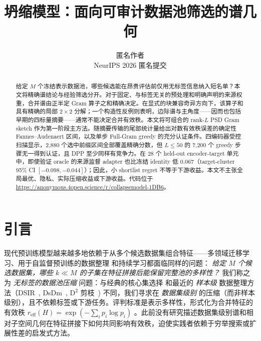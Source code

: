 \documentclass{article}
\title{坍缩模型：面向可审计数据池筛选的谱几何}
\author{%
  匿名作者\\
  NeurIPS 2026 匿名提交%
}
\date{}
\newcommand{\reff}{\ensuremath{r_{\mathrm{eff}}}\xspace}
\begin{document}
\maketitle

\begin{abstract}
给定 $M$ 个冻结表示数据池，哪些候选能在昂贵评估前仅用无标签信息纳入短名单？本文将精确谱结论与经验筛选分开。对于固定、与标签无关的预处理和明确声明的来源权重，合并谱由正半定 Gram 算子之和精确决定。在显式的块兼容奇异方向下，该算子和具有精确的局部 $2{\times}2$ 分解；一个构造性反例则表明，边际谱与主角度——因而也包括早期的四标量摘要——通常不能决定合并有效秩。本文将可组合的 rank-$L$ PSD Gram sketch 作为第一阶段主方法。随摘要传输的尾部统计量给出对数有效秩误差的确定性 Fannes--Audenaert 区间，以及单步 Full-Gram greedy 的充分认证条件。四编码器受控扫描显示，2,880 个选中前缀区间全部覆盖精确分数，但 $L\leq50$ 的 7,200 个 greedy 步骤无一得到认证，且 DPP 至少同样有竞争力。在 28 个 held-out encoder-target 单元中，即使验证 oracle 的来源监督 adapter 也比冻结 identity 低 $0.067$（target-cluster 95\% CI $[-0.098,-0.044]$）；因此，小 shortlist regret 不等于下游收益。本文不主张全局最优、隐私、实际压缩收益或下游收益。代码位于 \url{https://anonymous.4open.science/r/collapsemodel-1DB6}。
\end{abstract}
\section{引言}
\label{sec:intro}

现代预训练模型越来越多地依赖于从多个候选数据集组合特征——多领域迁移学习、用于自监督预训练的数据整理 \citep{gadre2023datacomp} 和持续学习都面临同样的问题：
\emph{给定 $M$ 个候选数据集，哪些 $k{\ll}M$ 的子集在特征拼接后能保留完整池的多样性？}
我们称之为 \emph{无标签的数据池压缩} 问题：与经典的核心集选择 \citep{mirzasoleiman2020coresets} 和最近的 \emph{样本级} 数据整理方法（DSIR~\citep{xie2023dsir}, DsDm~\citep{engstrom2024dsdm}, D$^2$ 剪枝~\citep{maharana2023d2pruning}) 不同，我们寻求在 \emph{数据集级别} 的压缩（而非样本级别），且不依赖标签或下游任务。评判标准是表示多样性，形式化为合并特征的有效秩 $\reff(H)=\exp(-\sum_i p_i\log p_i)$ \citep{roy2007effective,garrido2023rankme}。此前没有研究描述数据集级别谱和相对子空间几何在特征拼接下如何共同影响有效秩，迫使实践者依赖于穷举搜索或扩展性差的启发式方法。
\end{document}
